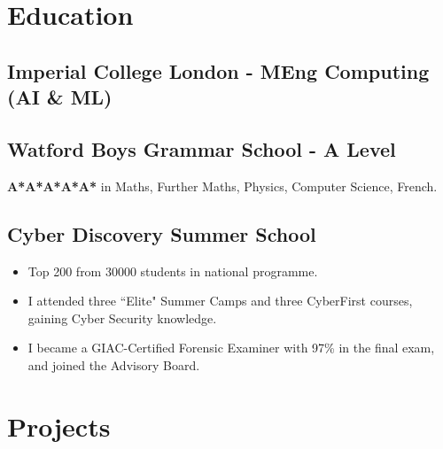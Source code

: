 \documentclass{Resume2}
\begin{document}
    \begin{center}  


\end{center}





	\section{Education}
		\subsection{Imperial College London - MEng Computing (AI \& ML)}
		\subsection{Watford Boys Grammar School - A Level}
		    \textbf{A*A*A*A*A*} in Maths, Further Maths, Physics, Computer Science, French.
		\subsection{Cyber Discovery Summer School}
				\begin{itemize}
				    \item Top 200 from 30000 students in national programme.
				    \item I attended three ``Elite" Summer Camps and three CyberFirst courses, gaining Cyber Security knowledge.
				    \item I became a GIAC-Certified Forensic Examiner with 97\% in the final exam, and joined the Advisory Board.
				\end{itemize}
	\section{Projects}
\end{document}
